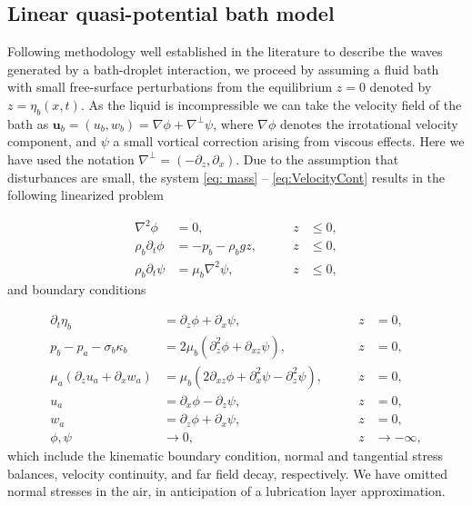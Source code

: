 \subsection{Linear quasi-potential bath model}


Following methodology well established in the literature \cite{milewski2015faraday,galeano2017non,galeano2021capillary, alventosa2023inertio} to describe the waves generated by a bath-droplet interaction, we proceed by assuming a fluid bath with small free-surface perturbations from the equilibrium $z=0$  denoted by $z=\eta_b (x,t)$. As the liquid is incompressible we can take the velocity field of the bath as  $\mathbf{u}_b = (u_b, w_b) = \nabla \phi + \nabla^\perp \psi$, where $\nabla \phi$ denotes the irrotational velocity component, and $\psi$ a small vortical correction arising from viscous effects. Here we have used the notation $\nabla^\perp = (-\partial_z, \partial_x)$. Due to the assumption that disturbances are small, the system \eqref{eq: mass} -- \eqref{eq:VelocityCont} results in the following linearized problem

\begin{align}
\nabla^2 \phi &= 0, \qquad &z&\le 0, \label{eq: laplace}\\
\rho_b \partial_t \phi &= - p_b - \rho_b g z, \qquad &z&\le 0, \\
\rho_b \partial_t \psi &= \mu_b \nabla^2 \psi, \qquad &z& \le 0, 
\end{align}
and boundary conditions

\begin{align}
\partial_t \eta_b  &= \partial_z \phi + \partial_x \psi , \qquad &z&=0,  \\
 p_b - p_a - \sigma_b \kappa_b &= 2\mu_b\left(\partial_z^2 \phi + \partial_{xz} \psi \right), \qquad &z&=0, \\
   \mu_a (\partial_z u_a + \partial_x w_a) &= \mu_b (2\partial_{xz} \phi + \partial_x^2 \psi - \partial_z^2 \psi) , \qquad &z&=0, \\
   u_a &= \partial_{x} \phi - \partial_z \psi, \qquad &z&=0, \\
    w_a &= \partial_{z} \phi + \partial_x \psi, \qquad &z&=0, \label{eq: z velocity match} \\
\phi,\psi &\to 0, \qquad &z &\to -\infty, \label{eq: end of full system}
\end{align}
which include the kinematic boundary condition, normal and tangential stress balances, velocity continuity, and far field decay, respectively. We have omitted normal stresses in the air, in anticipation of a lubrication layer approximation.

